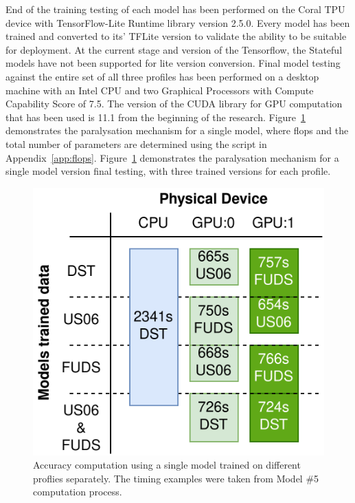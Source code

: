 %
End of the training testing of each model has been performed on the Coral TPU device with TensorFlow-Lite Runtime library version 2.5.0.
Every model has been trained and converted to its' TFLite version to validate the ability to be suitable for deployment.
At the current stage and version of the Tensorflow, the Stateful models have not been supported for lite version conversion.
Final model testing against the entire set of all three profiles has been performed on a desktop machine with an Intel CPU and two Graphical Processors with Compute Capability Score of 7.5.
The version of the CUDA library for GPU computation that has been used is 11.1 from the beginning of the research.
%
%
{
\mbox{Figure~\ref{fig:device_compute}} demonstrates the paralysation mechanism for a single model, where flops and the total number of parameters are determined using the script in Appendix~\ref{app:flops}.
}
{
\mbox{Figure~\ref{fig:device_compute}} demonstrates the paralysation mechanism for a single model version final testing, with three trained versions for each profile.
}
\begin{figure}[ht]
    \centering
    \includegraphics[width=\columnwidth]{II_Body/images/Accuracy_Compute.png}
    \caption{Accuracy computation using a single model trained on different proflies separately. The timing examples were taken from Model \#5 computation process.}
    \label{fig:device_compute}
\end{figure}

